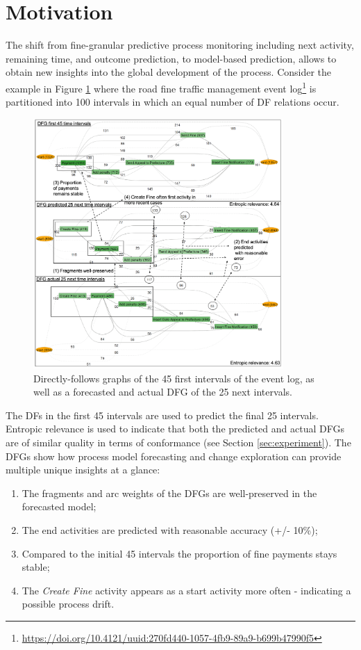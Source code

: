 \section{Motivation}\label{sec:2:motivation}

The shift from fine-granular predictive process monitoring including next activity, remaining time, and outcome prediction, to model-based prediction, allows to obtain new insights into the global development of the process.
Consider the example in Figure \ref{fig:dfg_example_intro} where the road fine traffic management event log\footnote{\url{https://doi.org/10.4121/uuid:270fd440-1057-4fb9-89a9-b699b47990f5}} is partitioned into 100 intervals in which an equal number of DF relations occur.
\begin{figure}
    \centering
    \includegraphics[width=0.85\textwidth]{img/MotExample2.png}
    \caption{Directly-follows graphs of the 45 first intervals of the event log, as well as a forecasted and actual DFG of the 25 next intervals.}
    \label{fig:dfg_example_intro}
\end{figure}
The DFs in the first 45 intervals are used to predict the final 25 intervals.
Entropic relevance \cite{DBLP:conf/icpm/PolyvyanyyMG20} is used to indicate that both the predicted and actual DFGs are of similar quality in terms of conformance (see Section \ref{sec:experiment}).
The DFGs show how process model forecasting and change exploration can provide multiple unique insights at a glance:
\begin{enumerate}
    \item The fragments and arc weights of the DFGs are well-preserved in the forecasted model;
    \item The end activities are predicted with reasonable accuracy (+/- 10\%);
    \item Compared to the initial 45 intervals the proportion of fine payments stays stable;
    \item The \emph{Create Fine} activity appears as a start activity more often - indicating a possible process drift.
\end{enumerate}
